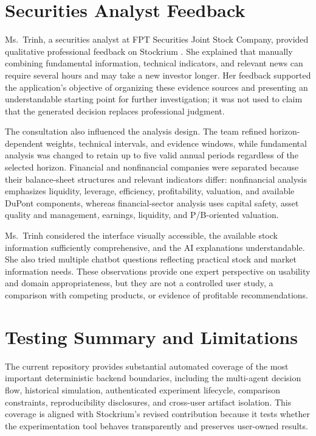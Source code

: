 \section{Securities Analyst Feedback}
\label{subsec:securities-analyst-feedback}

Ms.~Trinh, a securities analyst at FPT Securities Joint Stock Company, provided qualitative professional feedback on Stockrium \cite{trinh2026weights}. She explained that manually combining fundamental information, technical indicators, and relevant news can require several hours and may take a new investor longer. Her feedback supported the application's objective of organizing these evidence sources and presenting an understandable starting point for further investigation; it was not used to claim that the generated decision replaces professional judgment.

The consultation also influenced the analysis design. The team refined horizon-dependent weights, technical intervals, and evidence windows, while fundamental analysis was changed to retain up to five valid annual periods regardless of the selected horizon. Financial and nonfinancial companies were separated because their balance-sheet structures and relevant indicators differ: nonfinancial analysis emphasizes liquidity, leverage, efficiency, profitability, valuation, and available DuPont components, whereas financial-sector analysis uses capital safety, asset quality and management, earnings, liquidity, and P/B-oriented valuation.

Ms.~Trinh considered the interface visually accessible, the available stock information sufficiently comprehensive, and the AI explanations understandable. She also tried multiple chatbot questions reflecting practical stock and market information needs. These observations provide one expert perspective on usability and domain appropriateness, but they are not a controlled user study, a comparison with competing products, or evidence of profitable recommendations.

\section{Testing Summary and Limitations}
\label{sec:testing-summary-limitations}

The current repository provides substantial automated coverage of the most important deterministic backend boundaries, including the multi-agent decision flow, historical simulation, authenticated experiment lifecycle, comparison constraints, reproducibility disclosures, and cross-user artifact isolation. This coverage is aligned with Stockrium's revised contribution because it tests whether the experimentation tool behaves transparently and preserves user-owned results.

